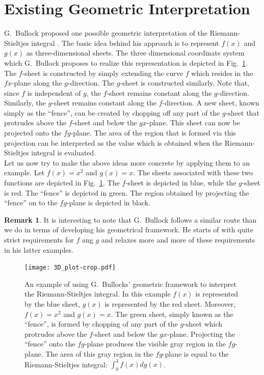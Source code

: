 \documentclass{article}
\theoremstyle{theorem}
\theoremstyle{definition}
\newtheorem*{remark}{Remark}
\begin{document}
\section{Existing Geometric Interpretation}
G.~Bullock proposed one possible geometric interpretation of the Riemann-Stieltjes integral \cite{bullock1988}. 
The basic idea behind his approach is to represent $f(x)$ and $g(x)$ as three-dimensional sheets. 
The three dimensional coordinate system which G.~Bullock proposes to realize this representation is depicted in 
Fig.~\ref{fig:bullock}. The $f$-sheet is constructed by simply extending the curve $f$ which resides in the $fx$-plane 
along the $g$-direction. The $g$-sheet is constructed similarly. Note that, since $f$ is independent of $g$, the $f$-sheet remains 
constant along the $g$-direction. Similarly, the $g$-sheet remains constant along the $f$-direction. 
A new sheet, known simply as the ``fence'', can be created by chopping off any part of the $g$-sheet that protrudes above the 
$f$-sheet and below the $gx$-plane. This sheet can now be projected onto the $fg$-plane. The area of the region that is formed 
via this projection can be interpreted as the value which is obtained when the Riemann-Stieltjes integral is evaluated.\\ 

\noindent
Let us now try to make the above ideas more concrete by applying them to an example. Let $f(x)=x^2$ and 
$g(x)=x$. The sheets associated with these two functions are depicted in Fig.~\ref{fig:bullock}. 
The $f$-sheet is depicted in blue, while the $g$-sheet is red. The ``fence'' is depicted in green. The region
obtained by projecting the ``fence'' on to the $fg$-plane is depicted in black.\\

\noindent
\begin{remark}
It is interesting to note that G.~Bullock follows a similar route than we do in terms of developing his geometrical framework.
He starts of with quite strict requirements for $f$ ang $g$ and relaxes more and more of these requirements in his latter 
examples. 
\end{remark}

\begin{figure}[htb]
\centering
\texttt{[image: 3D\_plot-crop.pdf]}
\caption{An example of using G.~Bullocks' geometric framework to interpret the Riemann-Stieltjes integral. In this example 
$f(x)$ is represented by the blue sheet, $g(x)$ is represented by the red sheet. Moreover, $f(x)=x^2$ and $g(x)=x$. The green sheet, simply known as the ``fence'', is formed 
by chopping of any part of the $g$-sheet which protrudes above the $f$-sheet and below the $gx$-plane. Projecting the ``fence''
onto the $fg$-plane produces the visible gray region in the $fg$-plane. The area of this gray region in the $fg$-plane is equal to the Riemann-Stieltjes integral:
$\int_{0}^{3} f(x) dg(x)$.}
\label{fig:bullock}
\end{figure}
\end{document}
